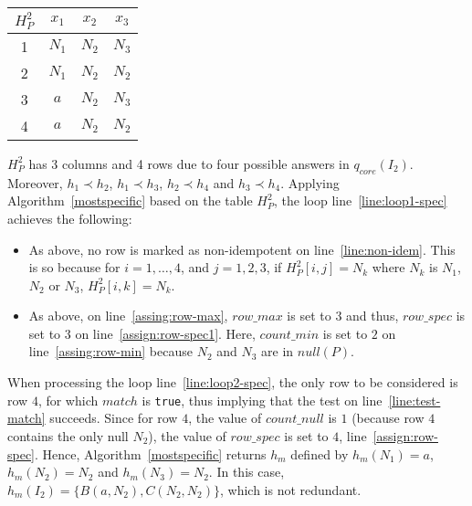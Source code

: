 \begin{example}
    \begin{center}
        \begin{tabular}{c|ccc}
            $H_P^2$ & $x_1$  & $x_2$ & $x_3$ \\ \hline
            1       & $N_1 $ & $N_2$ & $N_3$ \\
            2       & $N_1$  & $N_2$ & $N_2$ \\
            3       & $a$    & $N_2$ & $N_3$ \\
            4       & $a$    & $N_2$ & $N_2$ \\
        \end{tabular}
    \end{center}
    $H_P^2$ has 3 columns and 4 rows due to four possible answers in $q_{core}(I_2)$.
    Moreover,
    $h_1 \prec h_2$, $h_1 \prec h_3$, $h_2 \prec h_4$ and $h_3 \prec h_4$.
    Applying Algorithm~\ref{mostspecific} based on the table $H_P^2$, the loop line~\ref{line:loop1-spec} achieves the following:
    \begin{itemize}
        \item
              As above, no row is marked as non-idempotent on line~\ref{line:non-idem}.
              This is so because for $i=1, \ldots, 4$, and $j=1,2,3$, if $H^2_P[i,j]=N_k$ where $N_k$ is $N_1$, $N_2$ or $N_3$, $H^2_P[i,k]=N_k$.
        \item
              As above, on line~\ref{assing:row-max}, $row\_max$ is set to $3$ and thus, $row\_spec$ is set to $3$ on line~\ref{assign:row-spec1}.
              Here, $count\_min$ is set to $2$ on line~\ref{assing:row-min} because $N_2$ and $N_3$ are in $null(P)$.
    \end{itemize}
    When processing the loop line~\ref{line:loop2-spec}, the only row to be considered is row $4$, for which $match$ is {\tt true}, thus implying that the test on line~\ref{line:test-match} succeeds.
    Since for row $4$, the value of $count\_null$ is $1$ (because row $4$ contains the only null $N_2$), the value of $row\_spec$ is set to $4$, line~\ref{assign:row-spec}.
    Hence, Algorithm~\ref{mostspecific} returns $h_m$ defined by $h_m(N_1)=a$, $h_m(N_2)=N_2$ and $h_m(N_3)=N_2$.
    In this case,  $h_m(I_2)=\{B(a, N_2), C(N_2,N_2)\}$, which is not redundant.
\end{example}


